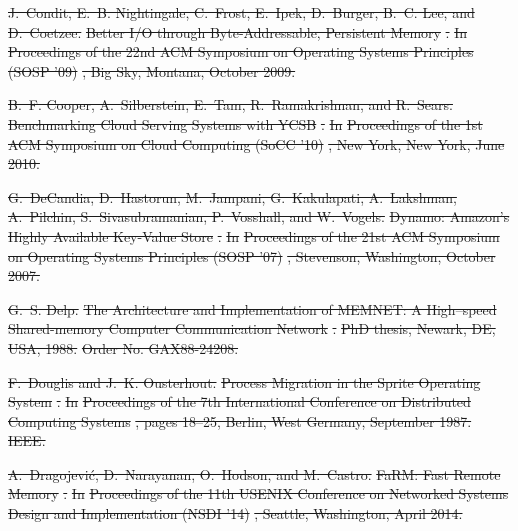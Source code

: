 \documentclass[sigconf]{acmart}
\renewcommand{\em}{\it}
\providecommand{\DIFdel}[1]{{\protect\color{red}\sout{#1}}}                      %
\begin{document}
{%
\DIFdel{J.~Condit, E.~B. Nightingale, C.~Frost, E.~Ipek, D.~Burger, B.~C. Lee, and
  D.~Coetzee.
}%
\DIFdel{Better I/O through Byte-Addressable, Persistent Memory}%
\DIFdel{.
}%
\DIFdel{In }%
\DIFdel{Proceedings of the 22nd ACM Symposium on Operating Systems
  Principles (SOSP '09)}%
\DIFdel{, Big Sky, Montana, October 2009.
}%

\DIFdel{B.~F. Cooper, A.~Silberstein, E.~Tam, R.~Ramakrishnan, and R.~Sears.
}%
\DIFdel{Benchmarking Cloud Serving Systems with YCSB}%
\DIFdel{.
}%
\DIFdel{In }%
\DIFdel{Proceedings of the 1st ACM Symposium on Cloud Computing (SoCC
  '10)}%
\DIFdel{, New York, New York, June 2010.
}%

\DIFdel{G.~DeCandia, D.~Hastorun, M.~Jampani, G.~Kakulapati, A.~Lakshman, A.~Pilchin,
  S.~Sivasubramanian, P.~Vosshall, and W.~Vogels.
}%
\DIFdel{Dynamo: Amazon's Highly Available Key-Value Store}%
\DIFdel{.
}%
\DIFdel{In }%
\DIFdel{Proceedings of the 21st ACM Symposium on Operating Systems
  Principles (SOSP '07)}%
\DIFdel{, Stevenson, Washington, October 2007.
}%

\DIFdel{G.~S. Delp.
}%
\DIFdel{The Architecture and Implementation of MEMNET: A High--speed
  Shared-memory Computer Communication Network}%
\DIFdel{.
}%
\DIFdel{PhD thesis, Newark, DE, USA, 1988.
}%
\DIFdel{Order No. GAX88-24208.
}%

\DIFdel{F.~Douglis and J.~K. Ousterhout.
}%
\DIFdel{Process Migration in the Sprite Operating System}%
\DIFdel{.
}%
\DIFdel{In }%
\DIFdel{Proceedings of the 7th International Conference on
  Distributed Computing Systems}%
\DIFdel{, pages 18--25, Berlin, West Germany, September
  1987. IEEE.
}%

\DIFdel{A.~Dragojević, D.~Narayanan, O.~Hodson, and M.~Castro.
}%
\DIFdel{FaRM: Fast Remote Memory}%
\DIFdel{.
}%
\DIFdel{In }%
\DIFdel{Proceedings of the 11th USENIX Conference on Networked
  Systems Design and Implementation (NSDI ’14)}%
\DIFdel{, Seattle, Washington, April
  2014.
}%

}
\end{document}
